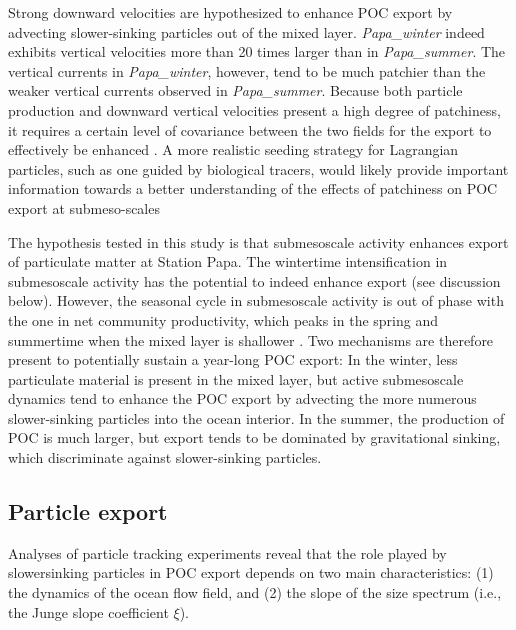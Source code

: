 \documentclass[draft,linenumbers]{agujournal2018}
\begin{document}
Strong downward velocities are hypothesized to enhance POC export by advecting slower-sinking particles out of the mixed layer. \textit{Papa\_winter} indeed exhibits vertical velocities more than 20 times larger than in \textit{Papa\_summer}. The vertical currents in \textit{Papa\_winter}, however, tend to be much patchier than the weaker vertical currents observed in \textit{Papa\_summer}. Because both particle production and downward vertical velocities present a high degree of patchiness, it requires a certain level of covariance between the two fields for the export to effectively be enhanced \citep{Mahadevan_2012}. A more realistic seeding strategy for Lagrangian particles, such as one guided by biological tracers, would likely provide important information towards a better understanding of the effects of patchiness on POC export at submeso-scales

The hypothesis tested in this study is that submesoscale activity enhances export of particulate matter at Station Papa. The wintertime intensification in submesoscale activity has the potential to indeed enhance export (see discussion below). However, the seasonal cycle in submesoscale activity is out of phase with the one in net community productivity, which peaks in the spring and summertime when the mixed layer is shallower \citep{Plant_2016}. Two mechanisms are therefore present to potentially sustain a year-long POC export: In the winter, less particulate material is present in the mixed layer, but active submesoscale dynamics tend to enhance the POC export by advecting the more numerous slower-sinking particles into the ocean interior. In the summer, the production of POC is much larger, but export tends to be dominated by gravitational sinking, which discriminate against slower-sinking particles.

\subsection{Particle export}
\label{sec: discussion_particle}

Analyses of particle tracking experiments reveal that the role played by slower\-sinking particles in POC export depends on two main characteristics: (1) the dynamics of the ocean flow field, and (2) the slope of the size spectrum (i.e., the Junge slope coefficient $\xi$).
\end{document}
